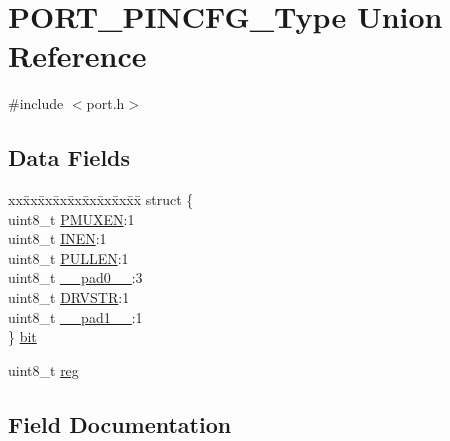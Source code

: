 \hypertarget{union_p_o_r_t___p_i_n_c_f_g___type}{}\section{P\+O\+R\+T\+\_\+\+P\+I\+N\+C\+F\+G\+\_\+\+Type Union Reference}
\label{union_p_o_r_t___p_i_n_c_f_g___type}


{\ttfamily \#include $<$port.\+h$>$}

\subsection*{Data Fields}
\begin{DoxyCompactItemize}
\item 
\begin{tabbing}
xx\=xx\=xx\=xx\=xx\=xx\=xx\=xx\=xx\=\kill
struct \{\\
\>uint8\_t \mbox{\hyperlink{union_p_o_r_t___p_i_n_c_f_g___type_a839f842b1cfeac2e9a75c20693a89975}{PMUXEN}}:1\\
\>uint8\_t \mbox{\hyperlink{union_p_o_r_t___p_i_n_c_f_g___type_a53ddd3cf0850893b83c6b2ad3b306cfa}{INEN}}:1\\
\>uint8\_t \mbox{\hyperlink{union_p_o_r_t___p_i_n_c_f_g___type_a436e1cf6b753084817dce9449fcfff64}{PULLEN}}:1\\
\>uint8\_t \mbox{\hyperlink{union_p_o_r_t___p_i_n_c_f_g___type_a8b4eebe79ded0459acec2f4950102ba3}{\_\_pad0\_\_}}:3\\
\>uint8\_t \mbox{\hyperlink{union_p_o_r_t___p_i_n_c_f_g___type_a145025a46127ce5b3fc3205548fbad4f}{DRVSTR}}:1\\
\>uint8\_t \mbox{\hyperlink{union_p_o_r_t___p_i_n_c_f_g___type_a77f12d2e278bd5c07712648ac0df5e08}{\_\_pad1\_\_}}:1\\
\} \mbox{\hyperlink{union_p_o_r_t___p_i_n_c_f_g___type_a977a5fa913f064530080f273108cd493}{bit}}\\

\end{tabbing}\item 
uint8\+\_\+t \mbox{\hyperlink{union_p_o_r_t___p_i_n_c_f_g___type_a9428adc9af4653a2050e2536b55dec8d}{reg}}
\end{DoxyCompactItemize}


\subsection{Field Documentation}
\mbox{\label{union_p_o_r_t___p_i_n_c_f_g___type_a8b4eebe79ded0459acec2f4950102ba3}} 

